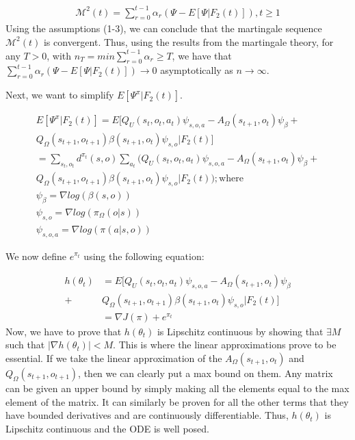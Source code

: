 \documentclass[letterpaper]{article} %
\begin{document}
\begin{equation} 
\begin{split}
\mathcal{M}^{2}(t) = \sum_{r=0}^{t-1}  \alpha_{r} (\Psi - E[\Psi| F_{2}(t)]), t \geq 1
\end{split}
\end{equation}
Using the assumptions (1-3), we can conclude that the martingale sequence {$\mathcal{M}^{2}(t)$} is convergent. Thus, using the results from the martingale theory, for any $T > 0$, with $n_{T} = min{\sum_{r=0}^{t-1}  \alpha_{r} \geq T}$, we have that $ \sum_{r=0}^{t-1}  \alpha_{r} (\Psi - E[\Psi| F_{2}(t)]) \to 0$ asymptotically as $n \to \infty$. 

Next, we want to simplify $ E[\Psi^{\pi}| F_{2}(t)]$.

\begin{equation} 
\begin{split}
E [ \Psi^{\pi}| F_{2}(t)] = E \bigg[ Q_U(s_{t},o_{t},a_{t}) \psi_{s,o,a} -
 A_\Omega(s_{t+1},o_{t}) \psi_{\beta} + \\
 Q_\Omega(s_{t+1},o_{t+1}) \beta(s_{t+1},o_{t}) \psi_{s,o}| F_{2}(t) \bigg] \\
 = \sum_{s_{t},o_{t}} d^{\pi_{t}}(s,o) \sum_{a_{t}} \bigg( Q_U(s_{t},o_{t},a_{t}) \psi_{s,o,a} -
 A_\Omega(s_{t+1},o_{t}) \psi_{\beta} + \\
 Q_\Omega(s_{t+1},o_{t+1}) \beta(s_{t+1},o_{t}) \psi_{s,o}| F_{2}(t) \bigg); \text{where} \\
 \psi_{\beta} = \nabla log( \beta(s,o)) \\
\psi_{s,o} = \nabla log(\pi_\Omega(o|s)) \\
\psi_{s,o,a} =\nabla log(\pi(a|s,o)) 
\end{split}
\end{equation}

We now define $e^{\pi_{t}}$ using the following equation:

\begin{equation} 
\begin{split}
h(\theta_{t})
 &= E \bigg[ Q_U(s_{t},o_{t},a_{t}) \psi_{s,o,a} -
 A_\Omega(s_{t+1},o_{t}) \psi_{\beta} \\+ &
 Q_\Omega(s_{t+1},o_{t+1}) \beta(s_{t+1},o_{t}) \psi_{s,o}| F_{2}(t) \bigg]\\
&= \nabla J(\pi) + e^{\pi_{t}}
\end{split}
\end{equation}
Now, we have to prove that $h(\theta_{t})$ is Lipschitz continuous by showing that $\exists M$ such that $ |\nabla h(\theta_{t})| < M $. This is where the linear approximations prove to be essential. If we take the linear approximation of the $A_\Omega(s_{t+1},o_{t})$ and $ Q_\Omega(s_{t+1},o_{t+1})$, then we can clearly put a max bound on them. Any matrix can be given an upper bound by simply making all the elements equal to the max element of the matrix. It can similarly be proven for all the other terms that they have bounded derivatives and are continuously differentiable. Thus, $h(\theta_{t})$ is Lipschitz continuous and the ODE is well posed.
\end{document}
